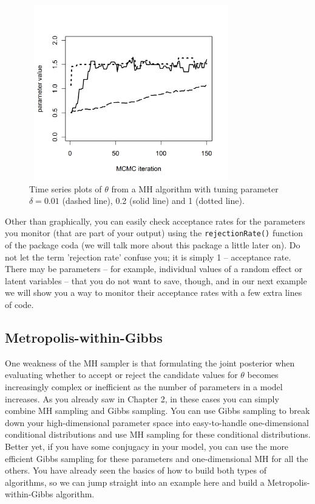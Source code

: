  \begin{figure}
\begin{center}
\includegraphics[height=3in,width=3.5in]{Ch7/figs/tuning}
\end{center}
\caption{Time series plots of $\theta$ from a MH algorithm with tuning parameter  $\delta = 0.01$ (dashed line), 0.2 (solid line) and  1 (dotted line).}
\label{mcmc.fig.tuning}
\end{figure}

Other than graphically, you can easily check acceptance rates for the
parameters you monitor (that are part of your output) using the
\verb#rejectionRate()# function of the package coda (we will talk more
about this package a little later on). Do not let the term 'rejection
rate' confuse you; it is simply 1 -- acceptance rate. There may be
parameters -- for example, individual values of a random effect or
latent variables -- that you do not want to save, though, and in our
next example we will show you a way to monitor their acceptance rates
with a few extra lines of code.



\subsection{ Metropolis-within-Gibbs }

One weakness of the MH sampler is that formulating the joint posterior
when evaluating whether to accept or reject the candidate values for
$\theta$ becomes increasingly complex or inefficient as the number of
parameters in a model increases. As you already saw in Chapter 2, in
these cases you can simply combine MH sampling and Gibbs sampling. You
can use Gibbs sampling to break down your high-dimensional parameter
space into easy-to-handle one-dimensional conditional distributions
and use MH sampling for these conditional distributions. Better yet,
if you have some conjugacy in your model, you can use the more
efficient Gibbs sampling for these parameters and one-dimensional MH
for all the others. You have already seen the basics of how to build
both types of algorithms, so we can jump straight into an example here
and build a Metropolis-within-Gibbs algorithm.

